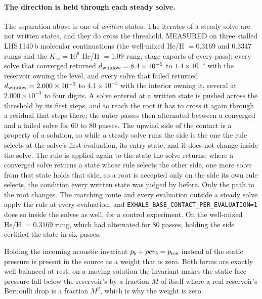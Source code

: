 \paragraph{The direction is held through each steady solve.}
The separation above is one of \emph{written} states.  The iterates of a
steady solve are not written states, and they do cross the threshold.
MEASURED on three stalled LHS\,1140\,b molecular continuations (the
well-mixed He/H $=0.3169$ and $0.3347$ rungs and the $K_{zz}=10^9$ He/H
$=1.09$ rung, stage exports of every pass): every solve that converged
returned $d_{\rm window}=8.4\times10^{-5}$ to $1.4\times10^{-4}$ with the
reservoir owning the level, and every solve that failed returned
$d_{\rm window}=2.000\times10^{-3}$ to $4.1\times10^{-3}$ with the interior
owning it, several at $2.000\times10^{-3}$ to four digits.  A solve entered at
a written state is pushed across the threshold by its first steps, and to
reach the root it has to cross it again through a residual that steps
there; the outer passes then alternated between a converged and a failed
solve for 60 to 80 passes.  The upwind side of the contact is a property of
a solution, so while a steady solve runs the side is the one the rule
selects at the solve's first evaluation, its entry state, and it does not
change inside the solve.  The rule is applied again to the state the solve
returns; where a converged solve returns a state whose rule selects the other
side, one more solve from that state holds that side, so a root is accepted
only on the side its own rule selects, the condition every written state was
judged by before.  Only the path to the root changes.  The marching route and
every evaluation outside a steady solve apply the rule at every evaluation,
and \texttt{EXHALE\_BASE\_CONTACT\_PER\_EVALUATION=1} does so inside the
solves as well, for a control experiment.  On the well-mixed He/H $=0.3169$
rung, which had alternated for 80 passes, holding the side certified the
state in six passes.

Holding the incoming acoustic invariant $p_b + \rho c v_b = p_{\rm res}$
instead of the static pressure is present in the source as a weight that is
zero.  Both forms are exactly well balanced at rest; on a moving solution the
invariant makes the static face pressure fall below the reservoir's by a
fraction $M$ of itself where a real reservoir's Bernoulli drop is a fraction
$M^2$, which is why the weight is zero.

